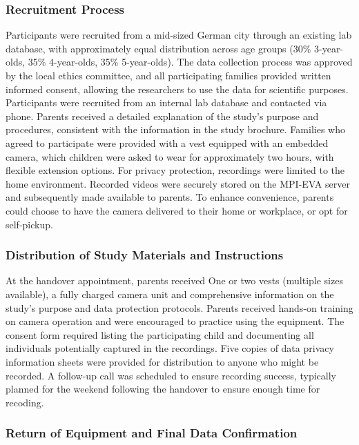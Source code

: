\documentclass[
  man,floatsintext]{apa6}
\begin{document}
\subsubsection{Recruitment Process}\label{recruitment-process-1}

Participants were recruited from a mid-sized German city through an existing lab database, with approximately equal distribution across age groups (30\% 3-year-olds, 35\% 4-year-olds, 35\% 5-year-olds). The data collection process was approved by the local ethics committee, and all participating families provided written informed consent, allowing the researchers to use the data for scientific purposes. Participants were recruited from an internal lab database and contacted via phone. Parents received a detailed explanation of the study's purpose and procedures, consistent with the information in the study brochure. Families who agreed to participate were provided with a vest equipped with an embedded camera, which children were asked to wear for approximately two hours, with flexible extension options. For privacy protection, recordings were limited to the home environment. Recorded videos were securely stored on the MPI-EVA server and subsequently made available to parents. To enhance convenience, parents could choose to have the camera delivered to their home or workplace, or opt for self-pickup.

\subsubsection{Distribution of Study Materials and Instructions}\label{distribution-of-study-materials-and-instructions-1}

At the handover appointment, parents received One or two vests (multiple sizes available), a fully charged camera unit and comprehensive information on the study's purpose and data protection protocols. Parents received hands-on training on camera operation and were encouraged to practice using the equipment. The consent form required listing the participating child and documenting all individuals potentially captured in the recordings. Five copies of data privacy information sheets were provided for distribution to anyone who might be recorded. A follow-up call was scheduled to ensure recording success, typically planned for the weekend following the handover to ensure enough time for recoding.

\subsubsection{Return of Equipment and Final Data Confirmation}\label{return-of-equipment-and-final-data-confirmation-1}
\end{document}
